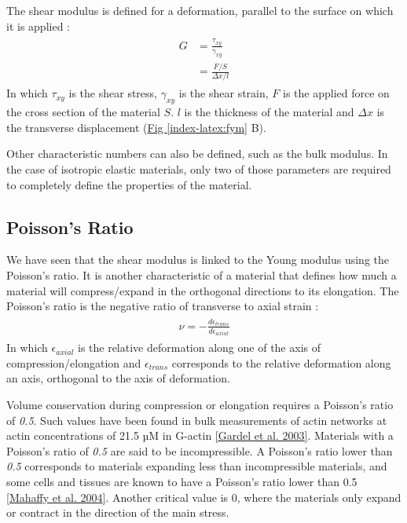 \documentclass[A4paperpaper,11pt,english]{sphinxmanual}
\begin{document}
The shear modulus is defined for a deformation, parallel to the surface on which it is applied :
\label{index-latex:equation-eqa9}\begin{gather}
\begin{split}G &= \frac{\tau_{xy}}{\gamma_{xy}} \\
  & = \frac{   F/S }{   \Delta x / l        }\end{split}\label{index-latex-eqa9}
\end{gather}
In which \(\tau_{xy}\) is the shear stress, \(\gamma_{xy}\) is the shear strain, \(F\) is the applied force
on the cross section of the material \(S\). \(l\) is the thickness of the material and \(\Delta x\) is the
transverse displacement (\hyperref[index-latex:fym]{Fig  \ref*{index-latex:fym}} B).

Other characteristic numbers can also be defined, such as the bulk modulus. In the case of isotropic
elastic materials, only two of those parameters are required to completely define
the properties of the material.


\subsection{Poisson's Ratio}
\label{index-latex:poisson-s-ratio}
We have seen that the shear modulus is linked to the Young modulus using
the Poisson's ratio. It is another characteristic of a material
that defines how much a material will compress/expand in the orthogonal directions to its elongation.
The Poisson's ratio is the negative ratio of transverse to axial strain :
\label{index-latex:equation-eqa10}\begin{gather}
\begin{split}\nu = - \frac{
    d \epsilon_{trans}
}{
    d \epsilon_{axial}
}\end{split}\label{index-latex-eqa10}
\end{gather}
In which \(\epsilon_{axial}\) is the relative deformation along one of the
axis of compression/elongation and \(\epsilon_{trans}\) corresponds to the
relative deformation along an axis, orthogonal to the axis of deformation.

Volume conservation during compression or elongation requires
a Poisson's ratio of \emph{0.5}. Such values have been found in bulk measurements of
actin networks at actin concentrations of 21.5 µM in G-actin {\hyperref[index-latex:gardel2003]{{[}Gardel et al. 2003{]}}}. Materials with a Poisson's ratio of \emph{0.5} are
said to be incompressible. A Poisson's ratio lower than \emph{0.5} corresponds to materials
expanding less than incompressible materials, and some cells and tissues are known to
have a Poisson's ratio lower than 0.5 {\hyperref[index-latex:mahaffy2004]{{[}Mahaffy et al. 2004{]}}}. Another critical value
is 0, where the materials only expand or contract in the direction of the
main stress.
\end{document}
